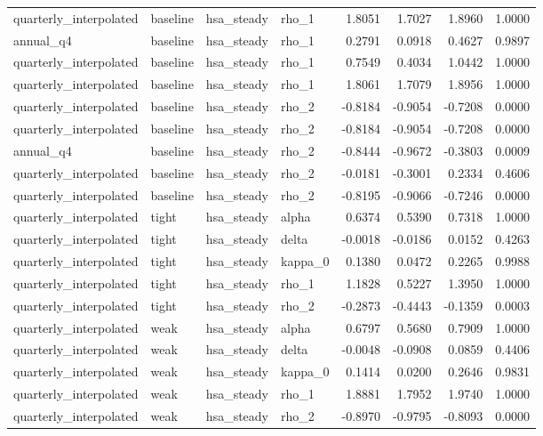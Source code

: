 \begin{tabular}{llllrrrr}
quarterly\_interpolated & baseline & hsa\_steady & rho\_1 & 1.8051 & 1.7027 & 1.8960 & 1.0000 \\
annual\_q4 & baseline & hsa\_steady & rho\_1 & 0.2791 & 0.0918 & 0.4627 & 0.9897 \\
quarterly\_interpolated & baseline & hsa\_steady & rho\_1 & 0.7549 & 0.4034 & 1.0442 & 1.0000 \\
quarterly\_interpolated & baseline & hsa\_steady & rho\_1 & 1.8061 & 1.7079 & 1.8956 & 1.0000 \\
quarterly\_interpolated & baseline & hsa\_steady & rho\_2 & -0.8184 & -0.9054 & -0.7208 & 0.0000 \\
quarterly\_interpolated & baseline & hsa\_steady & rho\_2 & -0.8184 & -0.9054 & -0.7208 & 0.0000 \\
annual\_q4 & baseline & hsa\_steady & rho\_2 & -0.8444 & -0.9672 & -0.3803 & 0.0009 \\
quarterly\_interpolated & baseline & hsa\_steady & rho\_2 & -0.0181 & -0.3001 & 0.2334 & 0.4606 \\
quarterly\_interpolated & baseline & hsa\_steady & rho\_2 & -0.8195 & -0.9066 & -0.7246 & 0.0000 \\
quarterly\_interpolated & tight & hsa\_steady & alpha & 0.6374 & 0.5390 & 0.7318 & 1.0000 \\
quarterly\_interpolated & tight & hsa\_steady & delta & -0.0018 & -0.0186 & 0.0152 & 0.4263 \\
quarterly\_interpolated & tight & hsa\_steady & kappa\_0 & 0.1380 & 0.0472 & 0.2265 & 0.9988 \\
quarterly\_interpolated & tight & hsa\_steady & rho\_1 & 1.1828 & 0.5227 & 1.3950 & 1.0000 \\
quarterly\_interpolated & tight & hsa\_steady & rho\_2 & -0.2873 & -0.4443 & -0.1359 & 0.0003 \\
quarterly\_interpolated & weak & hsa\_steady & alpha & 0.6797 & 0.5680 & 0.7909 & 1.0000 \\
quarterly\_interpolated & weak & hsa\_steady & delta & -0.0048 & -0.0908 & 0.0859 & 0.4406 \\
quarterly\_interpolated & weak & hsa\_steady & kappa\_0 & 0.1414 & 0.0200 & 0.2646 & 0.9831 \\
quarterly\_interpolated & weak & hsa\_steady & rho\_1 & 1.8881 & 1.7952 & 1.9740 & 1.0000 \\
quarterly\_interpolated & weak & hsa\_steady & rho\_2 & -0.8970 & -0.9795 & -0.8093 & 0.0000 \\
\bottomrule
\end{tabular}
